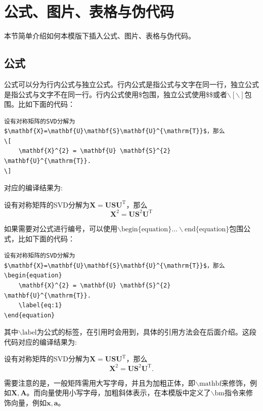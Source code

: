 \section{公式、图片、表格与伪代码}
本节简单介绍如何本模版下插入公式、图片、表格与伪代码。
\subsection{公式}

公式可以分为行内公式与独立公式。行内公式是指公式与文字在同一行，独立公式是指公式与文字不在同一行。行内公式使用\$包围，独立公式使用\$\$或者$\backslash [ \backslash]$包围。比如下面的代码：

\begin{lstlisting}
设有对称矩阵的SVD分解为$\mathbf{X}=\mathbf{U}\mathbf{S}\mathbf{U}^{\mathrm{T}}$，那么
\[
    \mathbf{X}^{2} = \mathbf{U} \mathbf{S}^{2} \mathbf{U}^{\mathrm{T}}.
\]
\end{lstlisting}
对应的编译结果为:
\begin{shaded}
设有对称矩阵的SVD分解为$\mathbf{X}=\mathbf{U}\mathbf{S}\mathbf{U}^{\mathrm{T}}$，那么
\[
    \mathbf{X}^{2} = \mathbf{U} \mathbf{S}^{2} \mathbf{U}^{\mathrm{T}}
\]
\end{shaded}
如果需要对公式进行编号，可以使用$\backslash \text{begin\{equation\}} \dots \backslash \text{end\{equation\}}$包围公式，比如下面的代码：
\begin{lstlisting}
设有对称矩阵的SVD分解为$\mathbf{X}=\mathbf{U}\mathbf{S}\mathbf{U}^{\mathrm{T}}$，那么
\begin{equation}
    \mathbf{X}^{2} = \mathbf{U} \mathbf{S}^{2} \mathbf{U}^{\mathrm{T}}.
    \label{eq:1}
\end{equation}
\end{lstlisting}
其中$\backslash \text{label}$为公式的标签，在引用时会用到，具体的引用方法会在后面介绍。这段代码对应的编译结果为:
\begin{shaded}
设有对称矩阵的SVD分解为$\mathbf{X}=\mathbf{U}\mathbf{S}\mathbf{U}^{\mathrm{T}}$，那么
\begin{equation}
    \mathbf{X}^{2} = \mathbf{U} \mathbf{S}^{2} \mathbf{U}^{\mathrm{T}}.
    \label{eq:1}
\end{equation}
\end{shaded}


需要注意的是，一般矩阵需用大写字母，并且为加粗正体，即$\backslash \text{mathbf}$来修饰，例如$\mathbf{X},\mathbf{A}$。而向量使用小写字母，加粗斜体表示，在本模版中定义了$\backslash \text{bm}$指令来修饰向量，例如$\bm{x},\bm{a}$。

